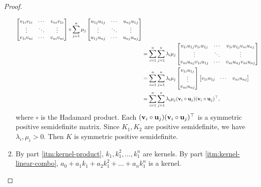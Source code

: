 \begin{proof}
\begin{enumerate}
\begin{align*}
\begin{bmatrix}
                v_{1i} v_{1i} & \cdots & v_{ni} v_{1i} \\
                \vdots & \ddots & \vdots\\
                v_{1i} v_{ni} & \cdots & v_{ni} v_{ni}\\
            \end{bmatrix} \circ
            \sum_{j=1}^{n} \mu_{j}
            \begin{bmatrix}
                u_{1j} u_{1j} & \cdots & u_{nj} u_{1j} \\
                \vdots & \ddots & \vdots\\
                u_{1j} u_{nj} & \cdots & u_{nj} u_{nj}\\
            \end{bmatrix}\\
            &= \sum_{i=1}^{n} \sum_{j=1}^{n} \lambda_{i} \mu_{j}
            \begin{bmatrix}
                v_{1i} u_{1j} v_{1i} u_{1j} & \cdots & v_{1i} u_{1j} v_{ni} u_{nj} \\
                \vdots & \ddots & \vdots\\
                v_{ni} u_{nj} v_{1i} u_{1j} & \cdots & v_{ni} u_{nj} v_{ni}  u_{nj}
            \end{bmatrix}\\
            &= \sum_{i=1}^{n} \sum_{j=1}^{n} \lambda_{i} \mu_{j}
            \begin{bmatrix}
                v_{1i} u_{1j} \\ \vdots \\ v_{ni} u_{nj}
            \end{bmatrix}
            \begin{bmatrix}
                v_{1i} u_{1j} & \cdots & v_{ni} u_{nj}
            \end{bmatrix}\\
            &= \sum_{i=1}^{n} \sum_{j=1}^{n} \lambda_{i} \mu_{j}
            (\mathbf{v}_i \circ \mathbf{u}_j) (\mathbf{v}_i \circ \mathbf{u}_j)^\top,
        \end{align*}
        where \(\circ\) is the Hadamard product.
        Each \((\mathbf{v}_i \circ \mathbf{u}_j) (\mathbf{v}_i \circ \mathbf{u}_j)^\top\) is a symmetric positive semidefinite matrix.
        Since \(K_1, K_2\) are positive semidefinite, we have \(\lambda_i, \mu_i > 0\).
        Then \(K\) is symmetric positive semidefinite.
        \item By part \ref{itm:kernel-product}, \(k_1, k_1^2, \dots, k_1^n\) are kernels.
        By part \ref{itm:kernel-linear-combo}, \(a_0 + a_1 k_1 + a_2 k_1^2 + \dots + a_n k_1^n\) is a kernel.

\end{enumerate}
\end{proof}
